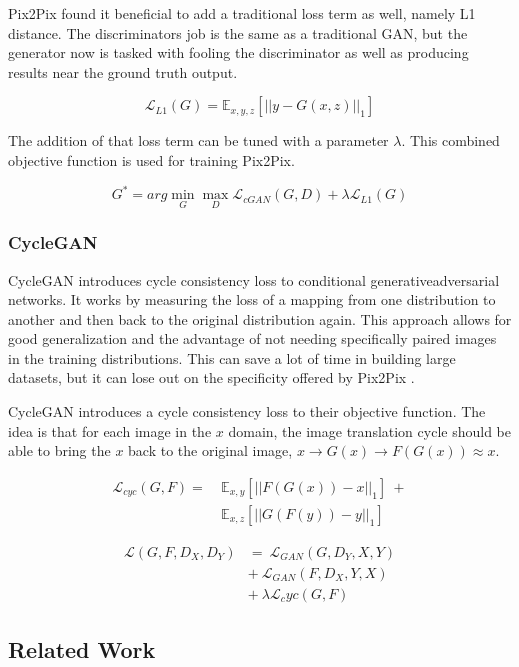 \documentclass[twocolumn]{article}
\begin{document}
	Pix2Pix found it beneficial to add a traditional loss term as well, namely L1 distance. The discriminators job is the same as a traditional GAN, but the generator now is tasked with fooling the discriminator as well as producing results near the ground truth output.
	
	$$
		\mathcal{L}_{L1}(G) = \mathbb{E}_{x,y,z}[|| y - G(x, z) ||_1]		
	$$

	The addition of that loss term can be tuned with a parameter  $\lambda$. This combined objective function is used for training Pix2Pix.
	
	$$	
		G^* = arg \mathop{min}_G \mathop{max}_D \mathcal{L}_{cGAN}(G, D) + \lambda \mathcal{L}_{L1}(G)
	$$
	
	\subsubsection{CycleGAN}
	
	CycleGAN introduces cycle consistency loss to conditional generativeadversarial networks. It works by measuring the loss of a mapping from one distribution to another and then back to the original distribution again. This approach allows for good generalization and the advantage of not needing specifically paired images in the training distributions. This can save a lot of time in building large datasets, but it can lose out on the specificity offered by Pix2Pix \cite{zhu2017unpaired}.
	
	CycleGAN introduces a cycle consistency loss to their objective function. The idea is that for each image in the $x$ domain, the image translation cycle should be able to bring the $x$ back to the original image, $x \rightarrow G(x) \rightarrow F(G(x)) \approx x$.
	
	\begin{align*}
		\mathcal{L}_{cyc}(G, F) =\ & \mathbb{E}_{x,y}[||F(G(x)) - x||_1]\ + \\
		& \mathbb{E}_{x,z}[||G(F(y)) - y||_1]
	\end{align*}
	
	\begin{align*}
		\mathcal{L}(G, F, D_X, D_Y) &=\ \mathcal{L}_{GAN}(G, D_Y, X, Y) \\
		&+\ \mathcal{L}_{GAN}(F, D_X, Y, X) \\
		&+\ \lambda \mathcal{L}_cyc (G, F)  
	\end{align*}
	

	\subsection{Related Work}
\end{document}
